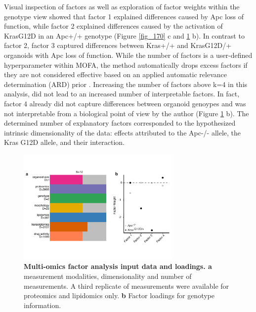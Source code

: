 \begin{flushleft}
Visual inspection of factors as well as exploration of factor weights within the genotype view showed that factor 1 explained differences caused by Apc loss of function, while factor 2 explained differences caused by the activation of KrasG12D in an Apc+/+ genotype (Figure \ref{fig_170} c and \ref{fig_180} b). In contrast to factor 2, factor 3 captured differences between Kras+/+ and KrasG12D/+ organoids with Apc loss of function. While the number of factors is a user-defined hyperparameter within MOFA, the method automatically drops excess factors if they are not considered effective based on an applied automatic relevance determination (ARD) prior \citep{Argelaguet2018-yi}. Increasing the number of factors above k=4 in this analysis, did not lead to an increased number of interpretable factors. In fact, factor 4 already did not capture differences between organoid genoypes and was not interpretable from a biological point of view by the author (Figure \ref{fig_180} b). The determined number of explanatory factors corresponded to the hypothesized intrinsic dimensionality of the data: effects attributed to the Apc-/- allele, the Kras G12D allele, and their interaction.

\begin{figure}[h!]
\centering
\includegraphics[width=300,
                height=\textheight,
                keepaspectratio]{figures/adenomaprofiling/pdf/fig_1_8.pdf}
\caption[Multi-omics factor analysis input data and loadings]{\textbf{Multi-omics factor analysis input data and loadings. a} measurement modalities, dimensionality and number of measurements. A third replicate of measurements were available for proteomics and lipidomics only. \textbf{b} Factor loadings for genotype information.} 
\label{fig_180}
\end{figure}
\bigbreak


\end{flushleft}
